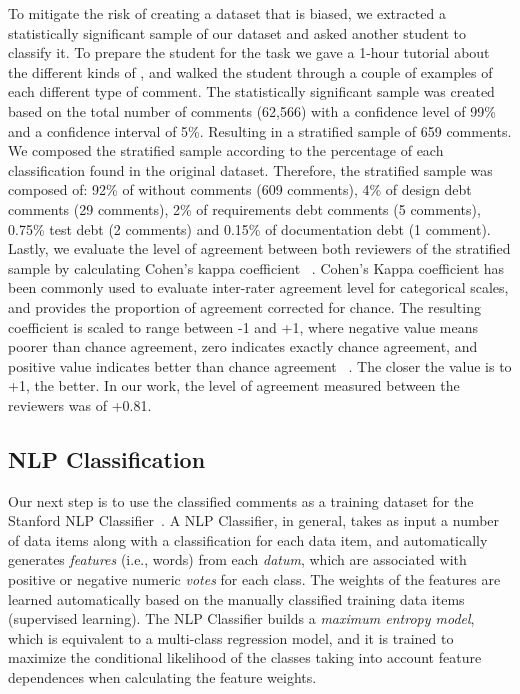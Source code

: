 To mitigate the risk of creating a dataset that is biased, we extracted a statistically significant sample of our dataset and asked another student to classify it. To prepare the student for the task we gave a 1-hour tutorial about the different kinds of \SATD, and walked the student through a couple of examples of each different type of \SATD comment. The statistically significant sample was created based on the total number of comments (62,566) with a confidence level of 99\% and a confidence interval of 5\%. Resulting in a stratified sample of 659 comments. We composed the stratified sample according to the percentage of each classification found in the original dataset. Therefore, the stratified sample was composed of: 92\% of without \SATD comments (609 comments), 4\% of design debt comments (29 comments), 2\% of requirements debt comments (5 comments), 0.75\% test debt (2 comments) and 0.15\% of documentation debt (1 comment). Lastly, we evaluate the level of agreement between both reviewers of the stratified sample by calculating Cohen's kappa coefficient ~\cite{cohen1960coefficient}. Cohen's Kappa coefficient has been commonly used to evaluate inter-rater agreement level for categorical scales, and provides the proportion of agreement corrected for chance. The resulting coefficient is scaled to range between -1 and +1, where negative value means poorer than chance agreement, zero indicates exactly chance agreement, and positive value indicates better than chance agreement ~\cite{fleiss1973equivalence}. The closer the value is to +1, the better. In our work, the level of agreement measured between the reviewers was of +0.81.


\subsection{NLP Classification} %
\label{sub:run_the_nlp_classifier}


Our next step is to use the classified \SATD comments as a training dataset for the Stanford NLP Classifier~\cite{Manning2014ACL}.
A NLP Classifier, in general, takes as input a number of data items along with a classification for each data item, and automatically generates \textit{features} (i.e., words) from each \textit{datum}, which are associated with positive or negative numeric \textit{votes} for each class. The weights of the features are learned automatically based on the manually classified training data items (supervised learning). The NLP Classifier builds a \textit{maximum entropy model}, which is equivalent to a multi-class regression model, and it is trained to maximize the conditional likelihood of the classes taking into account feature dependences when calculating the feature weights.

